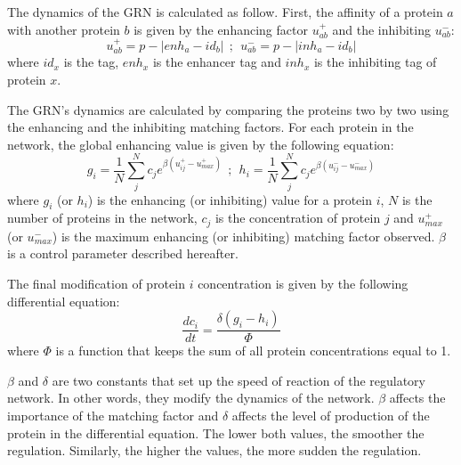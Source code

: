 The dynamics of the GRN is calculated as follow. First, the affinity of a
protein $a$ with another protein $b$ is given by the enhancing factor
$u^{+}_{ab}$ and the inhibiting $u^{-}_{ab}$:
\begin{equation}
u^{+}_{ab}=p-|enh_a-id_b|~~;~~u^{-}_{ab}=p-|inh_a-id_b|
\end{equation}
where $id_x$ is the tag, $enh_x$ is the enhancer tag and $inh_x$
is the inhibiting tag of protein $x$.

The GRN's dynamics are calculated by comparing the proteins two by two using the
enhancing and the inhibiting matching factors. For each protein in the network,
the global enhancing value is given by the following equation:
\begin{equation}
g_i=\frac{1}{N}\sum_j^N{c_je^{\beta (u^{+}_{ij}-u_{max}^{+})}}~~;~~h_i=\frac{1}{N}\sum_j^N{c_je^{\beta (u^{-}_{ij}-u_{max}^{-})}}
\end{equation}
where $g_i$ (or $h_i$) is the enhancing (or inhibiting) value for a
protein $i$, $N$ is the number of proteins in the network, $c_j$ is the
concentration of protein $j$ and $u_{max}^{+}$ (or $u_{max}^{-}$) is the
maximum enhancing (or inhibiting) matching factor observed. $\beta$ is a
control parameter described hereafter.

The final modification of protein $i$ concentration is given by the following
differential equation:
\begin{equation}
\frac{dc_i}{dt}=\frac{\delta(g_i-h_i)}{\Phi}
\end{equation}
where $\Phi$ is a function that keeps the sum of all protein concentrations
equal to 1.

$\beta$ and $\delta$ are two constants that set up the speed of reaction of the
regulatory network. In other words, they modify the dynamics of the network. $\beta$
affects the importance of the matching factor and $\delta$ affects the level of
production of the protein in the differential equation. The lower both values,
the smoother the regulation. Similarly, the higher the values, the more sudden
the regulation. 
